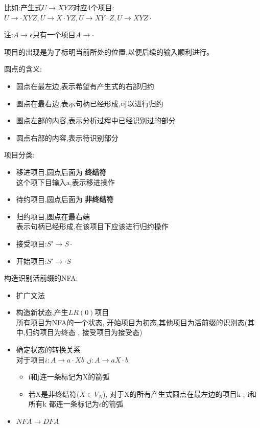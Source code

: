 \documentclass[UTF8,a4paper]{ctexart}
\newcommand{\spaceline}{\vspace{\baselineskip}}
\begin{document}
 比如:产生式$U\to XYZ$对应4个项目:$U\to \cdot XYZ,U\to X\cdot YZ,U\to XY\cdot Z,U\to XYZ\cdot $

 注:$A\to \epsilon$只有一个项目$A\to \cdot$

 项目的出现是为了标明当前所处的位置,以便后续的输入顺利进行。

 圆点的含义:
 \begin{itemize}
  \item 圆点在最左边,表示希望有产生式的右部归约
  \item 圆点在最右边,表示句柄已经形成,可以进行归约
  \item 圆点左部的内容,表示分析过程中已经识别过的部分
  \item 圆点右部的内容,表示待识别部分
 \end{itemize}

 项目分类:
 \begin{itemize}
  \item 移进项目,圆点后面为 \textbf{终结符}\\
        这个项下目输入a,表示移进操作
  \item 待约项目,圆点后面为 \textbf{非终结符}
  \item 归约项目,圆点在最右端\\
        表示句柄已经形成,在该项目下应该进行归约操作
  \item 接受项目:$S' \to S\cdot$
  \item 开始项目:$S' \to \cdot S$
 \end{itemize}

 \spaceline
 构造识别活前缀的NFA:
 \begin{itemize}
  \item 扩广文法
  \item 构造新状态,产生$LR(0)$项目\\
        所有项目为NFA的一个状态, 开始项目为初态,其他项目为活前缀的识别态(其中,归约项目为终态 , 接受项目为接受态)
  \item 确定状态的转换关系\\
        对于项目$i:A\to a\cdot Xb$ ,$j:A\to aX\cdot b$
        \begin{itemize}
         \item i和j连一条标记为X的箭弧
         \item 若X是非终结符($X\in V_N$), 对于X的所有产生式圆点在最左边的项目k , i和所有k 都连一条标记为$\epsilon$的箭弧
        \end{itemize}
  \item $NFA \to DFA$
 \end{itemize}
\end{document}
